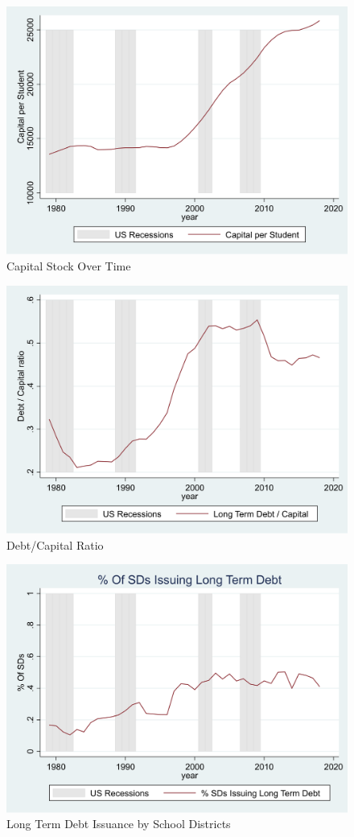 \begin{figure}[H]
    \centering
    \includegraphics[width=.75\linewidth]{_fig/Capital_timeseries.png}
    \captionsetup{width=0.80\textwidth}
    \caption{\label{fig:app:one}
    Capital Stock Over Time}
\end{figure}
\clearpage 
\begin{figure}[H]
    \centering
    \includegraphics[width=.75\linewidth]{_fig/debtcapitalratio_timeseries.png}
    \captionsetup{width=0.80\textwidth}
    \caption{\label{fig:app:two}
    Debt/Capital Ratio }
\end{figure}
\clearpage 
\begin{figure}[H]
    \centering
    \includegraphics[width=.75\linewidth]{_fig/pctissueing_timeseries.png}
    \captionsetup{width=0.80\textwidth}
    \caption{\label{fig:app:three}
     Long Term Debt Issuance by School Districts}
\end{figure}
\clearpage

